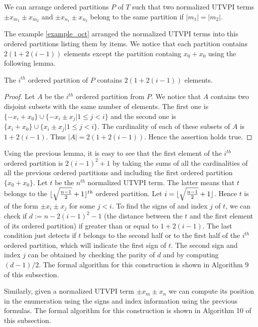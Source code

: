 We can arrange ordered partitions $P$ of $T$ such 
that two normalized UTVPI terms $\pm x_{m_1} \pm x_{m_2}$
and $\pm x_{n_1} \pm x_{n_2}$ belong to the same partition
if $|m_1| = |m_2|$.

The example \ref{example_oct} arranged the normalized 
UTVPI terms into this ordered partitions listing them
by items. We notice that each partition
contains $2(1 + 2(i-1))$ elements except the
partition containg $x_0 + x_0$ using the 
following lemma.

\begin{lemma}
  The $i^{th}$ ordered partition of $P$ contains 
  $2(1 + 2(i-1))$ elements.
\end{lemma}

\begin{proof}
  Let $A$ be the $i^{th}$ ordered partition from 
  $P$. We notice that $A$ contains two
  disjoint subsets with the same number of elements.
  The first one is $\{-x_i + x_0\} \cup 
  \{-x_i \pm x_j | 1 \leq j < i \}$
  and the second one is 
  $\{x_i + x_0\} \cup \{x_i \pm x_j | 1 \leq j < i \}$.
  The cardinality of each of these subsets of $A$
  is $1 + 2(i-1)$. Thus $|A| = 2(1 + 2(i-1))$. Hence
  the assertion holds true.
\end{proof}

Using the previous lemma, it is easy to see
that the first element of the $i^{th}$ ordered partition 
is $2(i-1)^2 + 1$ by taking the sums of all the 
cardinalities of all the previous ordered partitions
and including the first ordered partition 
$\{ x_0 + x_0 \}$. Let $t$ be the $n^{th}$ normalized 
UTVPI term. The latter means that $t$ belongs
to the 
$\lfloor \sqrt{\frac{n-1}{2}} + 1 \rfloor^{th}$ ordered 
partition. Let $i = \lfloor \sqrt{\frac{n-1}{2}} + 1 \rfloor$.
Hence $t$ is
of the form $\pm x_i \pm x_j$ for some $j < i$.
To find the signs of and index $j$ of $t$, 
we can check if $d := n - 2(i-1)^2 -1$ 
(the distance between the $t$ and the
first element of its ordered partition) 
if greater than or equal to $1 + 2(i-1)$. The last 
condition just detects if $t$ belongs to the second
half or to the first half of the $i^{th}$ ordered
partition, which will indicate the first sign of $t$.
The second sign and index $j$ can be obtained by checking
the parity of $d$ and by computing $(d-1)/2$.
The formal algorithm for this construction is shown in Algorithm 9 of 
this subsection. 

Similarly, given a normalized UTVPI term $\pm x_m \pm x_n$
we can compute its position in the enumeration using the
signs and index information using the previous formulas.
The formal algorithm for this construction is shown in Algorithm 10
of this subsection.

